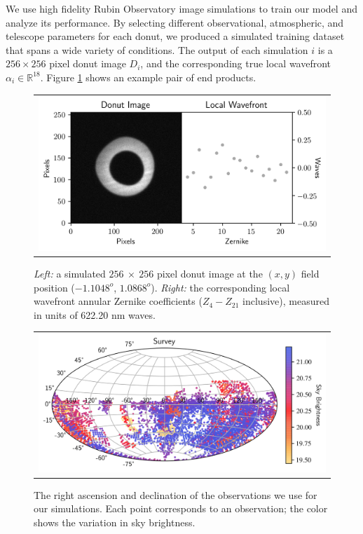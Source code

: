We use high fidelity Rubin Observatory image simulations to train our model and analyze its performance. By selecting different observational, atmospheric, and telescope parameters for each donut, we produced a simulated training dataset that spans a wide variety of conditions. The output of each simulation $i$ is a $256 \times 256$ pixel donut image $D_i$, and the corresponding true local wavefront $\alpha_i \in \mathbb{R}^{18}$. Figure \ref{fig:donut} shows an example pair of end products. 
% 
\begin{figure} [!htbp]
\begin{center}
\begin{tabular}{c}
\includegraphics[width=6in]{figs/simulating_donuts/example_atm.png}
\end{tabular}
\end{center}
\caption[Simuated Donut and Local Wavefront]{\textit{Left:} a simulated $256\ \times\ 256$ pixel donut image at the $(x,y)$ field position ($-1.1048^o$, $1.0868^o$). \textit{Right:} the corresponding local wavefront annular Zernike coefficients ($Z_4-Z_{21}$ inclusive), measured in units of 622.20 nm waves. \label{fig:donut}}
\end{figure}

\begin{figure} [!htbp]
\begin{center}
\begin{tabular}{c}
\includegraphics[width=6in]{figs/simulating_donuts/survey.png}
\end{tabular}
\end{center}
\caption[Survey Footprint]{The right ascension and declination of the observations we use for our simulations. Each point corresponds to an observation; the color shows the variation in sky brightness.\label{fig:survey}}
\end{figure}

